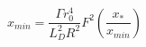 \begin{equation}
x_{min}=\frac{\Gamma 
r_0^4}{L_D^2R^2}F^2\left(\frac{x_{*}}{x_{min}}\right)
\end{equation}

